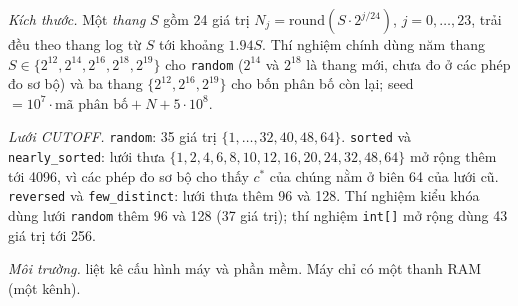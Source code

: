\documentclass[12pt,a4paper]{article}
\begin{document}
\emph{Kích thước.} Một \emph{thang} $S$ gồm 24 giá trị $N_j = \mathrm{round}(S \cdot 2^{j/24})$, $j = 0, \dots, 23$, trải đều theo thang log từ $S$ tới khoảng $1.94S$. Thí nghiệm chính dùng năm thang $S \in \{2^{12}, 2^{14}, 2^{16}, 2^{18}, 2^{19}\}$ cho \texttt{random} ($2^{14}$ và $2^{18}$ là thang mới, chưa đo ở các phép đo sơ bộ) và ba thang $\{2^{12}, 2^{16}, 2^{19}\}$ cho bốn phân bố còn lại; seed $= 10^7 \cdot \text{mã phân bố} + N + 5 \cdot 10^8$.

\emph{Lưới CUTOFF.} \texttt{random}: 35 giá trị $\{1, \dots, 32, 40, 48, 64\}$. \texttt{sorted} và \texttt{nearly\_sorted}: lưới thưa $\{1, 2, 4, 6, 8, 10, 12, 16, 20, 24, 32, 48, 64\}$ mở rộng thêm tới 4096, vì các phép đo sơ bộ cho thấy $c^*$ của chúng nằm ở biên 64 của lưới cũ. \texttt{reversed} và \texttt{few\_distinct}: lưới thưa thêm 96 và 128. Thí nghiệm kiểu khóa dùng lưới \texttt{random} thêm 96 và 128 (37 giá trị); thí nghiệm \texttt{int[]} mở rộng dùng 43 giá trị tới 256.

\emph{Môi trường.}  liệt kê cấu hình máy và phần mềm. Máy chỉ có một thanh RAM (một kênh).
\begin{table}[htbp]
\centering\small
\caption{Cấu hình môi trường thí nghiệm.}\label{tab:env}

\end{table}
\end{document}
